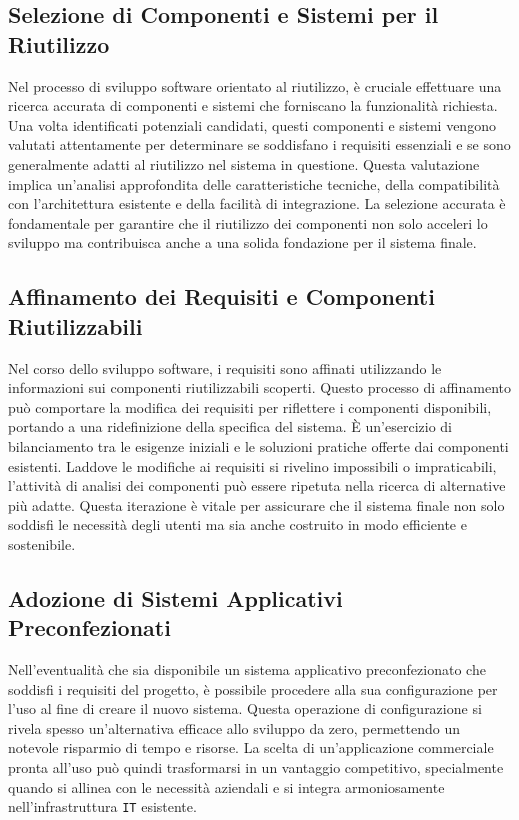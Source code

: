 \subsection{Selezione di Componenti e Sistemi per il Riutilizzo}
Nel processo di sviluppo software orientato al riutilizzo, è cruciale effettuare
una ricerca accurata di componenti e sistemi che forniscano la funzionalità
richiesta. Una volta identificati potenziali candidati, questi componenti e
sistemi vengono valutati attentamente per determinare se soddisfano i requisiti
essenziali e se sono generalmente adatti al riutilizzo nel sistema in questione.
Questa valutazione implica un'analisi approfondita delle caratteristiche tecniche,
della compatibilità con l'architettura esistente e della facilità di integrazione.
La selezione accurata è fondamentale per garantire che il riutilizzo dei componenti
non solo acceleri lo sviluppo ma contribuisca anche a una solida fondazione per il
sistema finale.
\subsection{Affinamento dei Requisiti e Componenti Riutilizzabili}
Nel corso dello sviluppo software, i requisiti sono affinati utilizzando le
informazioni sui componenti riutilizzabili scoperti. Questo processo di affinamento
può comportare la modifica dei requisiti per riflettere i componenti disponibili,
portando a una ridefinizione della specifica del sistema. È un'esercizio di
bilanciamento tra le esigenze iniziali e le soluzioni pratiche offerte dai
componenti esistenti. Laddove le modifiche ai requisiti si rivelino impossibili
o impraticabili, l'attività di analisi dei componenti può essere ripetuta nella
ricerca di alternative più adatte. Questa iterazione è vitale per assicurare che
il sistema finale non solo soddisfi le necessità degli utenti ma sia anche
costruito in modo efficiente e sostenibile.
\subsection{Adozione di Sistemi Applicativi Preconfezionati}
Nell'eventualità che sia disponibile un sistema applicativo preconfezionato
che soddisfi i requisiti del progetto, è possibile procedere alla sua configurazione
per l'uso al fine di creare il nuovo sistema. Questa operazione di configurazione si
rivela spesso un'alternativa efficace allo sviluppo da zero, permettendo un notevole
risparmio di tempo e risorse. La scelta di un'applicazione commerciale pronta all'uso
può quindi trasformarsi in un vantaggio competitivo, specialmente quando si allinea
con le necessità aziendali e si integra armoniosamente nell'infrastruttura \texttt{IT}
esistente.
